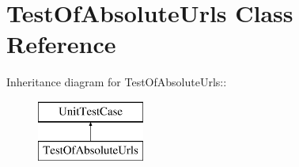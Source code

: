 \hypertarget{class_test_of_absolute_urls}{
\section{TestOfAbsoluteUrls Class Reference}
\label{class_test_of_absolute_urls}
}
Inheritance diagram for TestOfAbsoluteUrls::\begin{figure}[H]
\begin{center}
\leavevmode
\includegraphics[height=2cm]{class_test_of_absolute_urls}
\end{center}
\end{figure}
